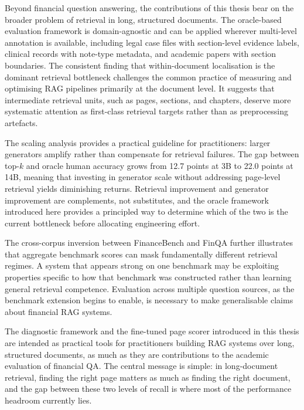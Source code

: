 \documentclass[12pt,twoside,maitrise]{dms}
\theoremstyle{definition}
\numberwithin{equation}{section}
\numberwithin{table}{chapter}
\numberwithin{figure}{chapter}
\begin{document}
Beyond financial question answering, the contributions of this thesis bear on the broader
problem of retrieval in long, structured documents. The oracle-based evaluation framework
is domain-agnostic and can be applied wherever multi-level annotation is available,
including legal case files with section-level evidence labels, clinical records with note-type
metadata, and academic papers with section boundaries. The consistent finding that
within-document localisation is the dominant retrieval bottleneck challenges the common
practice of measuring and optimising RAG pipelines primarily at the document level. It
suggests that intermediate retrieval units, such as pages, sections, and chapters, deserve
more systematic attention as first-class retrieval targets rather than as preprocessing
artefacts.

The scaling analysis provides a practical guideline for practitioners: larger generators
amplify rather than compensate for retrieval failures. The gap between top-$k$ and oracle
human accuracy grows from 12.7 points at 3B to 22.0 points at 14B, meaning that
investing in generator scale without addressing page-level retrieval yields diminishing
returns. Retrieval improvement and generator improvement are complements, not substitutes,
and the oracle framework introduced here provides a principled way to determine which of
the two is the current bottleneck before allocating engineering effort.

The cross-corpus inversion between FinanceBench and FinQA further illustrates that
aggregate benchmark scores can mask fundamentally different retrieval regimes. A system
that appears strong on one benchmark may be exploiting properties specific to how that
benchmark was constructed rather than learning general retrieval competence. Evaluation
across multiple question sources, as the benchmark extension begins to enable, is necessary
to make generalisable claims about financial RAG systems.

The diagnostic framework and the fine-tuned page scorer introduced in this thesis are
intended as practical tools for practitioners building RAG systems over long, structured
documents, as much as they are contributions to the academic evaluation of financial QA.
The central message is simple: in long-document retrieval, finding the right page matters
as much as finding the right document, and the gap between these two levels of recall is
where most of the performance headroom currently lies.


\def\bibname{R\'ef\'erences}

\end{document}
